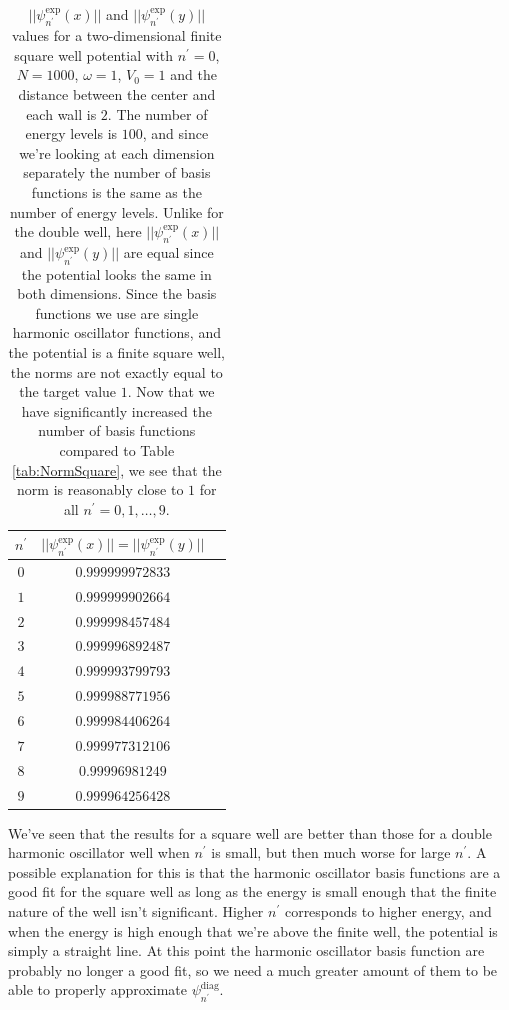 \documentclass[../main.tex]{subfiles}
\begin{document}
\begin{table}[!ht]
    \centering
    \begin{tabular}{ | c | c | c | }
        \hline
        $n^\prime$ & $||\psi_{n^\prime}^\textrm{exp}(x)|| = ||\psi_{n^\prime}^\textrm{exp}(y)||$\\*
        \hline
        $0$ & $0.999999972833$\\*
        \hline
        $1$ & $0.999999902664$\\*
        \hline
        $2$ & $0.999998457484$\\*
        \hline
        $3$ & $0.999996892487$\\*
        \hline
        $4$ & $0.999993799793$\\*
        \hline
        $5$ & $0.999988771956$\\*
        \hline
        $6$ & $0.999984406264$\\*
        \hline
        $7$ & $0.999977312106$\\*
        \hline
        $8$ & $0.99996981249$\\*
        \hline
        $9$ & $0.999964256428$\\*
        \hline
    \end{tabular}
    \caption{$||\psi_{n^\prime}^\textrm{exp}(x)||$ and $||\psi_{n^\prime}^\textrm{exp}(y)||$ values for a two-dimensional finite square well potential with $n^\prime = 0$, $N=1000$, $\omega = 1$, $V_0 = 1$ and the distance between the center and each wall is $2$. The number of energy levels is $100$, and since we're looking at each dimension separately the number of basis functions is the same as the number of energy levels. Unlike for the double well, here $||\psi_{n^\prime}^\textrm{exp}(x)||$ and $||\psi_{n^\prime}^\textrm{exp}(y)||$ are equal since the potential looks the same in both dimensions. Since the basis functions we use are single harmonic oscillator functions, and the potential is a finite square well, the norms are not exactly equal to the target value $1$. Now that we have significantly increased the number of basis functions compared to Table \ref{tab:NormSquare}, we see that the norm is reasonably close to $1$ for all $n^\prime = 0,1,\dots,9$.}
    \label{tab:NormSquare100}
\end{table}

We've seen that the results for a square well are better than those for a double harmonic oscillator well when $n^\prime$ is small, but then much worse for large $n^\prime$. A possible explanation for this is that the harmonic oscillator basis functions are a good fit for the square well as long as the energy is small enough that the finite nature of the well isn't significant. Higher $n^\prime$ corresponds to higher energy, and when the energy is high enough that we're above the finite well, the potential is simply a straight line. At this point the harmonic oscillator basis function are probably no longer a good fit, so we need a much greater amount of them to be able to properly approximate $\psi_{n^\prime}^\textrm{diag}$.
\end{document}
